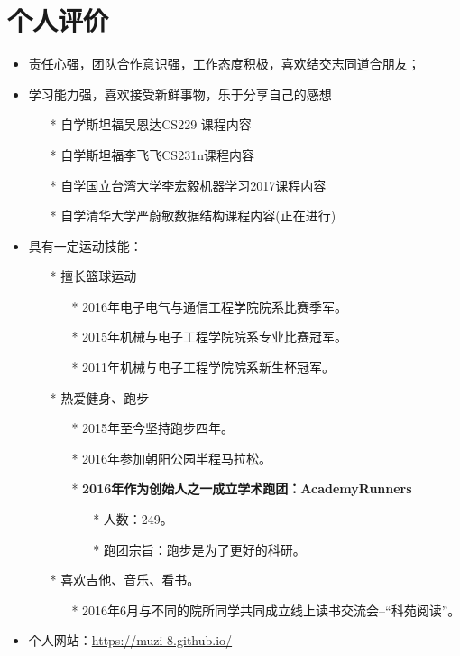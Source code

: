 \documentclass{resume}
\begin{document}
\section{个人评价}
\begin{itemize}[parsep=0.5ex]
  \item 责任心强，团队合作意识强，工作态度积极，喜欢结交志同道合朋友；
  \item 学习能力强，喜欢接受新鲜事物，乐于分享自己的感想
  \begin{itemize}[parsep=0.5ex]
  	\item[*] 自学斯坦福吴恩达CS229 课程内容 
  	\item[*] 自学斯坦福李飞飞CS231n课程内容
  	\item[*] 自学国立台湾大学李宏毅机器学习2017课程内容
  	\item[*] 自学清华大学严蔚敏数据结构课程内容(正在进行)
  \end{itemize}
  \item 具有一定运动技能：
  \begin{itemize}[parsep=0.5ex]
  	\item[*] 擅长篮球运动
  	\begin{itemize}[parsep=0.5ex]
  		\item[*] 2016年电子电气与通信工程学院院系比赛季军。
  		\item[*] 2015年机械与电子工程学院院系专业比赛冠军。
  		\item[*] 2011年机械与电子工程学院院系新生杯冠军。
    \end{itemize}
    \item[*] 热爱健身、跑步
    \begin{itemize}[parsep=0.5ex]
    	\item[*] 2015年至今坚持跑步四年。
    	\item[*] 2016年参加朝阳公园半程马拉松。
    	\item[*] \textbf{2016年作为创始人之一成立学术跑团：AcademyRunners}
    	\begin{itemize}[parsep=0.5ex]
    		\item[*] 人数：249。
    		\item[*] 跑团宗旨：跑步是为了更好的科研。
    	\end{itemize}
    \end{itemize}
    \item[*] 喜欢吉他、音乐、看书。
    \begin{itemize}[parsep=0.5ex]
    	\item[*] 2016年6月与不同的院所同学共同成立线上读书交流会--“科苑阅读”。
    \end{itemize}
  \end{itemize}
  \item 个人网站：\href{https://muzi-8.github.io/}{https://muzi-8.github.io/}
\end{itemize}

%
%
\end{document}
